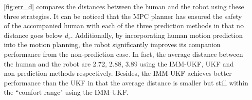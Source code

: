 \documentclass[journal]{IEEEtran}
\begin{document}
	\cref{fig:err_d} compares the distances between the human and the robot using these three strategies.
	It can be noticed that the MPC planner has ensured the safety of the accompanied human with each of the three prediction methods in that no distance goes below $d_s$.
	Additionally, by incorporating human motion prediction into the motion planning, the robot significantly improves its companion performance from the non-prediction case.
	In fact, the average distance between the human and the robot are 2.72, 2.88, 3.89 using the IMM-UKF, UKF and non-prediction methods respectively.
	Besides, the IMM-UKF achieves better performance than the UKF in that the average distance is smaller but still within the ``comfort range" using the IMM-UKF.
\end{document}
